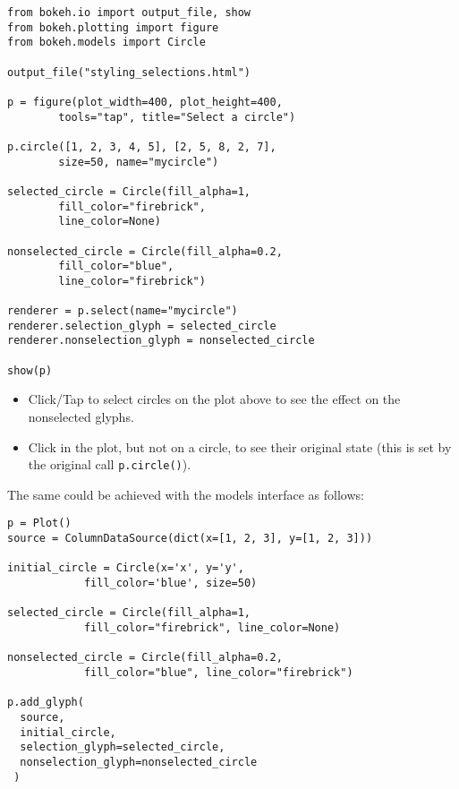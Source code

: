 \documentclass[a4paper,12pt]{article}
\begin{document}
\begin{framed}
	\begin{verbatim}
from bokeh.io import output_file, show
from bokeh.plotting import figure
from bokeh.models import Circle

output_file("styling_selections.html")

p = figure(plot_width=400, plot_height=400, 
        tools="tap", title="Select a circle")
        
p.circle([1, 2, 3, 4, 5], [2, 5, 8, 2, 7], 
        size=50, name="mycircle")

selected_circle = Circle(fill_alpha=1, 
        fill_color="firebrick", 
        line_color=None)
        
nonselected_circle = Circle(fill_alpha=0.2, 
        fill_color="blue", 
        line_color="firebrick")

renderer = p.select(name="mycircle")
renderer.selection_glyph = selected_circle
renderer.nonselection_glyph = nonselected_circle

show(p)

\end{verbatim}
\end{framed}

\begin{itemize}

\item Click/Tap to select circles on the plot above to see the effect on the nonselected glyphs.

\item Click in the plot, but not on a circle, to see their original state (this is set by the original call \texttt{p.circle()}).
\end{itemize}

The same could be achieved with the models interface as follows:


\begin{framed}
	\begin{verbatim}p = Plot()
source = ColumnDataSource(dict(x=[1, 2, 3], y=[1, 2, 3]))

initial_circle = Circle(x='x', y='y', 
			fill_color='blue', size=50)
			
selected_circle = Circle(fill_alpha=1, 
			fill_color="firebrick", line_color=None)
			
nonselected_circle = Circle(fill_alpha=0.2, 
			fill_color="blue", line_color="firebrick")

p.add_glyph(
  source,
  initial_circle,
  selection_glyph=selected_circle,
  nonselection_glyph=nonselected_circle
 )
\end{verbatim}
\end{framed}
\end{document}
